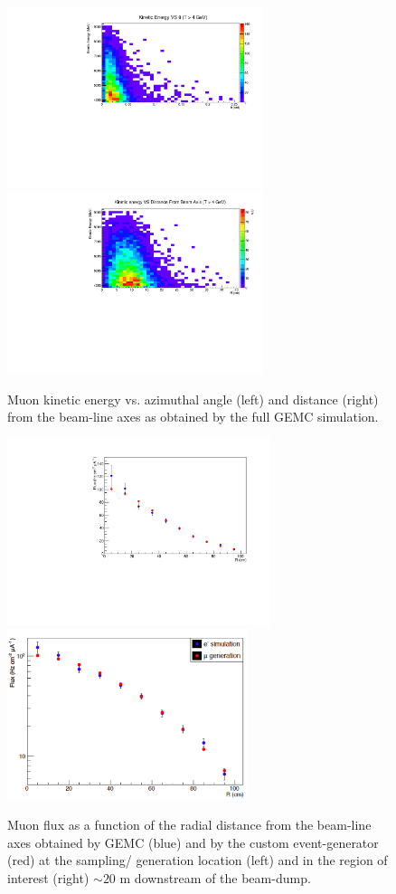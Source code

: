 \begin{figure}[h!] 
\center
\includegraphics[width=7.5cm]{figs/EkinVStheta.pdf}
\includegraphics[width=7.5cm]{figs/EkinVSR.pdf}
\caption{Muon kinetic energy vs. azimuthal angle (left) and distance (right) from the beam-line axes as obtained by the full GEMC simulation.}
\label{fig:mu-sampling}
\end{figure}
\begin{figure}[h!] 
\center
\includegraphics[width=7.7cm]{figs/SimVSGen.pdf}
\includegraphics[width=7.0cm]{figs/mu-comp-far.pdf}
\caption{Muon flux as a function of the radial  distance from the beam-line axes obtained by GEMC (blue) and by the custom event-generator (red) at the sampling/ generation location (left) and in the region of interest (right) $\sim 20$ m downstream of the beam-dump.}
\label{fig:mu-sampling-extract} 
\end{figure}


